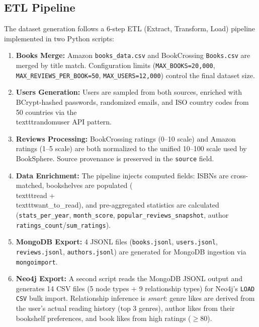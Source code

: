 \subsection{ETL Pipeline}
\label{sec:etl_pipeline}
The dataset generation follows a 6-step ETL (Extract, Transform, Load) pipeline implemented in two Python scripts:

\begin{enumerate}
    \item \textbf{Books Merge:} Amazon \texttt{books\_data.csv} and BookCrossing \texttt{Books.csv} are merged by title match. Configuration limits (\texttt{MAX\_BOOKS=20,000}, \texttt{MAX\_REVIEWS\_PER\_BOOK=50}, \texttt{MAX\_USERS=12,000}) control the final dataset size.
    
    \item \textbf{Users Generation:} Users are sampled from both sources, enriched with BCrypt-hashed passwords, randomized emails, and ISO country codes from 50 countries via the \\texttt{randomuser} API pattern.
    
    \item \textbf{Reviews Processing:} BookCrossing ratings (0--10 scale) and Amazon ratings (1--5 scale) are both normalized to the unified 10--100 scale used by BookSphere. Source provenance is preserved in the \texttt{source} field.
    
    \item \textbf{Data Enrichment:} The pipeline injects computed fields: ISBNs are cross-matched, bookshelves are populated (\\texttt{read} + \\texttt{want\_to\_read}), and pre-aggregated statistics are calculated (\texttt{stats\_per\_year}, \texttt{month\_score}, \texttt{popular\_reviews\_snapshot}, author \texttt{ratings\_count}/\texttt{sum\_ratings}).
    
    \item \textbf{MongoDB Export:} 4 JSONL files (\texttt{books.jsonl}, \texttt{users.jsonl}, \texttt{reviews.jsonl}, \texttt{authors.jsonl}) are generated for MongoDB ingestion via \texttt{mongoimport}.
    
    \item \textbf{Neo4j Export:} A second script reads the MongoDB JSONL output and generates 14 CSV files (5 node types + 9 relationship types) for Neo4j's \texttt{LOAD CSV} bulk import. Relationship inference is \textit{smart}: genre likes are derived from the user's actual reading history (top 3 genres), author likes from their bookshelf preferences, and book likes from high ratings ($\geq$80).
\end{enumerate}

